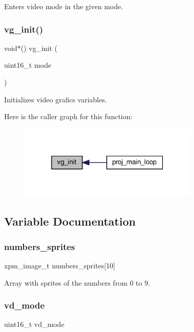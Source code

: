 Enters video mode in the given mode. 

\mbox{\label{group__graphics_gaa6c1ff5024cd4d15e476bce487584daa}} 
\subsubsection{\texorpdfstring{vg\+\_\+init()}{vg\_init()}}
{\footnotesize\ttfamily void$\ast$() vg\+\_\+init (\begin{DoxyParamCaption}\item[{uint16\+\_\+t}]{mode }\end{DoxyParamCaption})}



Initializes video grafics variables. 

Here is the caller graph for this function\+:
\nopagebreak
\begin{figure}[H]
\begin{center}
\leavevmode
\includegraphics[width=243pt]{group__graphics_gaa6c1ff5024cd4d15e476bce487584daa_icgraph}
\end{center}
\end{figure}


\subsection{Variable Documentation}
\mbox{\label{group__graphics_ga5aa03a801f01a5140c299908a06c47cd}} 
\subsubsection{\texorpdfstring{numbers\+\_\+sprites}{numbers\_sprites}}
{\footnotesize\ttfamily xpm\+\_\+image\+\_\+t numbers\+\_\+sprites\mbox{[}10\mbox{]}}



Array with sprites of the numbers from 0 to 9. 

\mbox{\label{group__graphics_ga505fdb0bbcbe5f0d3a5c4a3d1190401a}} 
\subsubsection{\texorpdfstring{vd\+\_\+mode}{vd\_mode}}
{\footnotesize\ttfamily uint16\+\_\+t vd\+\_\+mode}

